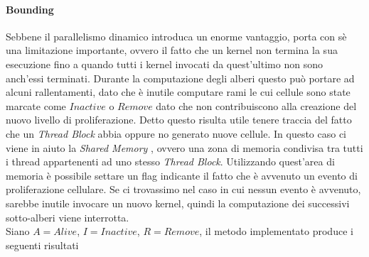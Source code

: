 \paragraph{Bounding}

Sebbene il parallelismo dinamico introduca un enorme vantaggio, porta con sè
una limitazione importante, ovvero il fatto che un kernel non termina la sua
esecuzione fino a quando tutti i kernel invocati da quest'ultimo non sono
anch'essi terminati. Durante la computazione degli alberi questo può portare
ad alcuni rallentamenti, dato che è inutile computare rami le cui cellule
sono state marcate come $Inactive$ o $Remove$ dato che non contribuiscono
alla creazione del nuovo livello di proliferazione.
Detto questo risulta utile tenere traccia del fatto che un \textit{Thread Block}
abbia oppure no generato nuove cellule.
In questo caso ci viene in aiuto la \textit{Shared Memory}\cite{sanders2010cuda}
, ovvero una zona di memoria condivisa tra tutti i thread appartenenti ad
uno stesso \textit{Thread Block}. Utilizzando quest'area di memoria è possibile
settare un flag indicante il fatto che è avvenuto un evento di proliferazione
cellulare. Se ci trovassimo nel caso in cui nessun evento è avvenuto, sarebbe
inutile invocare un nuovo kernel, quindi la computazione dei successivi
sotto-alberi viene interrotta.
\\
Siano $A = Alive$, $I = Inactive$, $R = Remove$, il metodo implementato
produce i seguenti risultati

\begin{figure}[H]
\begin{minipage}[b]{.5\linewidth}
\centering
{}
\end{minipage}
\begin{minipage}[b]{.5\linewidth}
\centering
{}
\end{minipage}
\caption{}
\end{figure}

